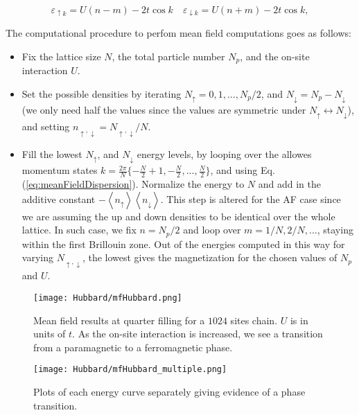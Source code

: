 \begin{equation}\label{eq:meanFieldDispersion}
\varepsilon_{\uparrow k} = U ( n - m ) - 2 t \cos k \quad \varepsilon_{\downarrow k} = U ( n + m ) - 2 t \cos k ,
\end{equation}

The computational procedure to perfom mean field computations goes as follows:
\begin{itemize}
\item Fix the lattice size $N$, the total particle number $N_p$, and the on-site interaction $U$.
\item Set the possible densities by iterating $N_\uparrow = 0, 1, ..., N_p / 2$, and $N_\downarrow = N_p - N_\downarrow$ (we only need half the values since the values are symmetric under $ N_\uparrow \leftrightarrow N_\downarrow$), and setting $n_{\uparrow, \downarrow} = N_{\uparrow, \downarrow} / N$.
\item Fill the lowest $N_\uparrow$, and $N_\downarrow$ energy levels, by looping over the allowes momentum states $k = \frac{2\pi}{N} \{ -\frac{N}{2} + 1, -\frac{N}{2}, ..., \frac{N}{2} \}$, and using Eq.(\ref{eq:meanFieldDispersion}).
Normalize the energy to $N$ and add in the additive constant $- \left\langle n_\uparrow \right\rangle \left\langle n_\downarrow \right\rangle$.
This step is altered for the \acs{AF} case since we are assuming the up and down densities to be identical over the whole lattice.
In such case, we fix $n = N_p / 2$ and loop over $m = 1/ N, 2 / N,...$, staying within the first Brillouin zone.
Out of the energies computed in this way for varying $N_{\uparrow, \downarrow}$, the lowest gives the magnetization for the chosen values of $N_p$ and $U$.
\end{itemize}

\begin{figure}
	\centering
\hspace{12mm}\texttt{[image: Hubbard/mfHubbard.png]}
	\caption[Mean field results for the \acs{1D} Hubbard model.]{Mean field results at quarter filling for a $ 1024$ sites chain.
	$U$ is in units of $t$.
	As the on-site interaction is increased, we see a transition from a paramagnetic to a ferromagnetic phase.}
	\label{fig:mft}
\end{figure}

\begin{figure}[H]
	\centering
\texttt{[image: Hubbard/mfHubbard\_multiple.png]}
	\caption[Mean field results for the \acs{1D} Hubbard model: closing in on the phase transition.]{Plots of each energy curve separately giving evidence of a phase transition.
	}
	\label{fig:mft_multiple}
\end{figure}

